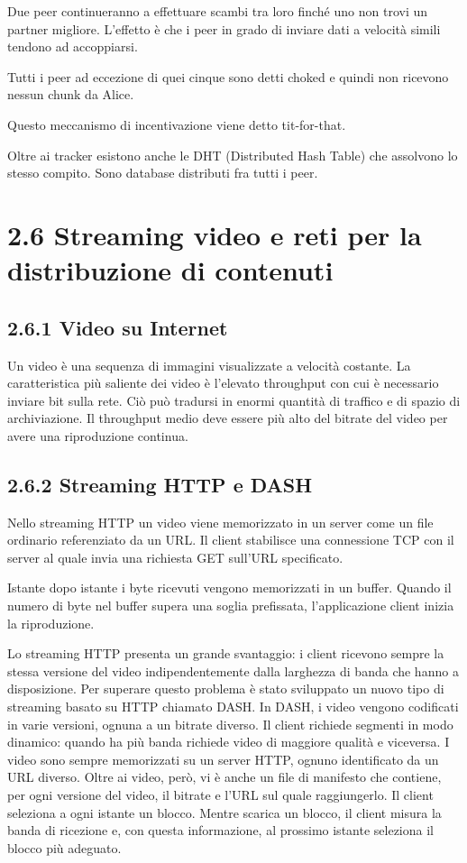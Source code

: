 \documentclass{book}
\begin{document}
Due peer continueranno a effettuare scambi tra loro finché uno non trovi un partner migliore. L'effetto è che i peer in grado di inviare dati a velocità simili tendono ad accoppiarsi.

Tutti i peer ad eccezione di quei cinque sono detti choked e quindi non ricevono nessun chunk da Alice.

Questo meccanismo di incentivazione viene detto tit-for-that.

Oltre ai tracker esistono anche le DHT (Distributed Hash Table) che assolvono lo stesso compito. Sono database distributi fra tutti i peer.

\section*{2.6 Streaming video e reti per la distribuzione di contenuti}
\subsection*{2.6.1 Video su Internet}
Un video è una sequenza di immagini visualizzate a velocità costante. La caratteristica più saliente dei video è l'elevato throughput con cui è necessario inviare bit sulla rete. Ciò può tradursi in enormi quantità di traffico e di spazio di archiviazione. Il throughput medio deve essere più alto del bitrate del video per avere una riproduzione continua.

\subsection*{2.6.2 Streaming HTTP e DASH}
Nello streaming HTTP un video viene  memorizzato in un server come un file ordinario referenziato da un URL. Il client stabilisce una connessione TCP con il server al quale invia una richiesta GET sull'URL specificato.

Istante dopo istante i byte ricevuti vengono memorizzati in un buffer. Quando il numero di byte nel buffer supera una soglia prefissata, l'applicazione client inizia la riproduzione.

Lo streaming HTTP presenta un grande svantaggio: i client ricevono sempre la stessa versione del video indipendentemente dalla larghezza di banda che hanno a disposizione. Per superare questo problema è stato sviluppato un nuovo tipo di streaming basato su HTTP chiamato DASH. In DASH, i video vengono codificati in varie versioni, ognuna a un bitrate diverso. Il client richiede segmenti in modo dinamico: quando ha più banda richiede video di maggiore qualità e viceversa. I video sono sempre memorizzati su un server HTTP, ognuno identificato da un URL diverso. Oltre ai video, però, vi è anche un file di manifesto che contiene, per ogni versione del video, il bitrate e l'URL sul quale raggiungerlo. Il client seleziona a ogni istante un blocco. Mentre scarica un blocco, il client misura la banda di ricezione e, con questa informazione, al prossimo istante seleziona il blocco più adeguato.
\end{document}
